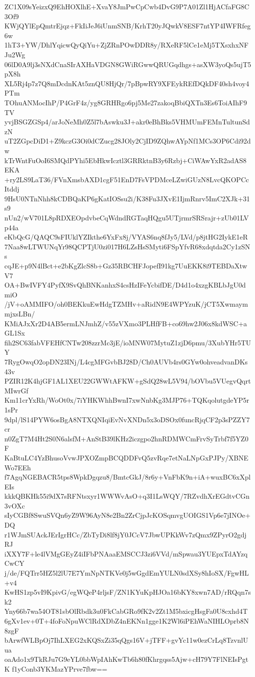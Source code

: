 ZC1X09sYeizxQ9EhHOXlhE+XvaY8JmPwCpCwb4DvG9P7A01Zl1HjACfaFG8C3Of9
KWjQYlEpQmtrEjqz+FkIiJeJ6iUnmSNB/KrhT20yJQwkV8ESF7ntYP4IWFRfeg6w
1hT3+YW/DhlYqicwQyQiYu+ZjZRnPOwDDR8y/RXeRF5lCe1eMj5TXsxhxNFJu2Wg
06lD0A9lj3sNXdCnaSIrAXHaVDGN8GWiRGwwQRUGqdhgs+asXW3yoQs5ujT5pX8h
XL5Rj4p7z7Q8mDcdnKAt5znQU8HjQr/7pBpwRY9XFEykREfDQkDF40sh4voy4PTm
TOhuANMocIhP/P4GrF4z/yg8GRHRgo6pj5Me27zakoqBbiQXTn3Es6ToiAIhF9TV
yvjBSGZGSp4/arJoNeMh0Z5l7bAswku3J+akr0eBhBks5VHMUmFEMnTultunSdzN
uT2ZGpcDiD1+Z9kczG3Oi0dCZucg28JOly2CjID9ZQhwAYpNf1MCs3OP6Cdi92dw
kTrWntFuOoI6SMQdPYhi5EbHkwIcztl3GRRktnB3y6Rzbj+CiWAwYxR2adAS8EKA
+ry2LS9LaT36/FVnXmsbAXD1cgF51EnD7FsVPDMceLZwiGUzN8LvcQKOPCcItddj
9HsU0NTnNhh8kCDBQaKP6gKatIOSsu2i/K38Fu3JXvE1IjmRnrv5ImC2XJk+31s9
nUn2/wV701L8pRDXEOpdvbeCqWdndRGTaqHQgu5UTjrmrSRSrajr+zUb01LVp44a
eKbQcG/QAQC9sFIUklYZIkthe6YxFx8j/VYAS6nq8fJy5/LVd/p8jtHG2IykE1eR
7Naa8wLTWUNqYr98QCPTjU0zi017H6LZsHsSMyti6FSpYfvR68xdqtda2Cy1zSNs
cqJE+p9N4lBct+e2bKgZlcS8b+Gz35RBCHFJopefI91kg7UuEKK8i9TEBDaXtwV7
OA+BwIVFY4PyfX9SvQhBNKanhxS4csHzIFeYcbifDE/D4d1o4xzgKBLbJgU0dmiO
/jV+oAMMIFO/oh0BEKkuEwHdgTZMHv+aRidN9E4WPYzuK/jCT5XwmaymmjxsLBn/
KMiAJxXr2D4AB5ermLNJmhZ/v55zVXmo3PLHfFB+co69hw2J06x8kdWSC+aGL1Sx
fih2SC63fabVFEHfCNTw208zzrMc3jE/ioMNW07MytuZ1zjD6pmu/3XubYHr5TUY
7RygOwqO2opDN23INj/L4cgMFGvbBJ28D/Ch0AUVb4rs0GYw0ohveadvanDKs43v
PZIR12K4hjGF1AL1XEU22GWWtAFKW+gSdQ28wL5V94/bOVbu5VUegvQqrtMIwrGf
Km11crYxRh/WoOt0x/7iYHKWhhBwnI7xwNnbKg3MJP76+TQKqolutgdeYP5r1sPr
9dpl/lS14PYW6osBgA8NTXQNIqiEvNvXNDn5x3oDSOx0funcRjqCF2p3sPZZY7cr
n0ZgT7M4Ht2S0N6alsfM+AnStB39lKHz2iczgpo2hnRDMWCmFrvSyTrbf7f5YZ0F
KaBtuLC4YzBhusoVvwJPXOZmpBCQDDFvQ5zvRqe7etNaLNpGxPJPy/XBNEWo7EEh
f7AgqNGEBACR5tps8WpkDgqzu8/BmtcGkJ/8r6y+VnFbK9n+iA+wuxBC6xXplEIs
kkkQBKHk55i9dX7sRFNtsxyr1WWWvAsO+q3I1LsWQY/7RZvdhXrEGdtvCGn3vOXc
sIyCGBf8SwuSVQn6yZ9W96AyN8e2Bn2ZrCjpJcKOSqmvgUOIGS1Vp6e7jINOe+DQ
r1WJmSUAckJErIgrHCc/ZbTyDi8lf8jY0JCcV7JbwUPKkWv7zQmx9ZPyrO2gdjRJ
iXXY7F+le4lVMgGEyZ4iIFbPNAaaEMSCCJ3zi6VVd/mSpwau3YUEpxTdAYzqCwCY
j/de/FQTrr5HZ5l2lU7E7YmNpNTKVe0j5wGgdEmYULN0sdXSy8hIoSX/FgwHL+v4
KwHS1zp5vI9KpivG/egWQeP4rljsF/ZN1KYuKpHJOa16bKY8xwn7AD/rRQqn7sk2
Yny66b7wa54OT81sbOlRbdk3u0FkCabGRo9fK2v2Zt1M5bxicgHsgFa0U8cxhd4T
6gXv1ev+0T+4foFoNpuWClRdXDbZ4nEKNn1gge1K2Wl6iPEhWaNIHLOprb8N8zgF
bArwfWLBpOj7IhLXEG2xKQSxZi35qQgs16V+jTFF+gvYc11w0ezCrLq8TzvnlUua
oaAdo1x9TkRJu7G9eYL0bbWpIAhKwTb6h80fKhrgqss5Ajw+cH79Y7FlNEIsPgtK
f1yConb3YKMazYPrve7fbw==
